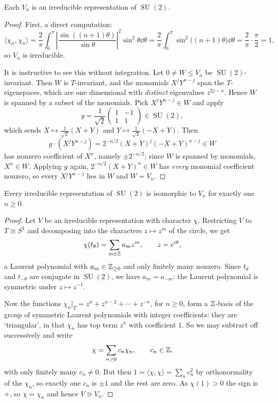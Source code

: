 \documentclass[a4paper]{scrartcl}
\newcommand{\SU}{\operatorname{SU}}
\newcommand{\ip}[2]{\langle #1, #2 \rangle}
\begin{document}
\begin{theorem}
	Each $V_n$ is an irreducible representation of $\SU(2)$.
\end{theorem}
\begin{proof}
	First, a direct computation:
	$$\ip{\chi_n}{\chi_n} = \frac2\pi\int_0^\pi\left|\frac{\sin((n+1)\theta)}{\sin\theta}\right|^2\sin^2\theta\dd\theta = \frac2\pi\int_0^\pi\sin^2\big((n+1)\theta\big)\dd\theta = \frac2\pi\cdot\frac\pi2 = 1,$$
	so $V_n$ is irreducible.

	It is instructive to see this without integration. Let $0\neq W\leq V_n$ be $\SU(2)$-invariant. Then $W$ is $T$-invariant, and the monomials $X^jY^{n-j}$ span the $T$-eigenspaces, which are one dimensional with \emph{distinct} eigenvalues $z^{2j-n}$. Hence $W$ is spanned by a subset of the monomials. Pick $X^jY^{n-j}\in W$ and apply
	$$g = \frac1{\sqrt2}\begin{pmatrix}1&-1\\1&1\end{pmatrix}\in\SU(2),$$
	which sends $X\mapsto\frac{1}{\sqrt2}(X+Y)$ and $Y\mapsto\frac1{\sqrt2}(-X+Y)$. Then
	$$g\cdot(X^jY^{n-j}) = 2^{-n/2}(X+Y)^j(-X+Y)^{n-j}\in W$$
	has nonzero coefficient of $X^n$, namely $\pm2^{-n/2}$; since $W$ is spanned by monomials, $X^n\in W$. Applying $g$ again, $2^{-n/2}(X+Y)^n\in W$ has \emph{every} monomial coefficient nonzero, so every $X^jY^{n-j}$ lies in $W$ and $W = V_n$.
\end{proof}

\begin{theorem}
	Every irreducible representation of $\SU(2)$ is isomorphic to $V_n$ for exactly one $n\geq0$.
\end{theorem}
\begin{proof}
	Let $V$ be an irreducible representation with character $\chi$. Restricting $V$ to $T\cong S^1$ and decomposing into the characters $z\mapsto z^m$ of the circle, we get
	$$\chi(t_\theta) = \sum_{m\in\mathbb{Z}}a_mz^m, \qquad z = e^{i\theta},$$
	a Laurent polynomial with $a_m\in\mathbb{Z}_{\geq0}$ and only finitely many nonzero. Since $t_\theta$ and $t_{-\theta}$ are conjugate in $\SU(2)$, we have $a_m = a_{-m}$: the Laurent polynomial is symmetric under $z\mapsto z^{-1}$.

	Now the functions $\chi_n|_T = z^n+z^{n-2}+\cdots+z^{-n}$, for $n\geq 0$, form a $\mathbb{Z}$-basis of the group of symmetric Laurent polynomials with integer coefficients: they are `triangular', in that $\chi_n$ has top term $z^n$ with coefficient $1$. So we may subtract off successively and write
	$$\chi = \sum_{n\geq0}c_n\chi_n, \qquad c_n\in\mathbb{Z},$$
	with only finitely many $c_n\neq0$. But then $1 = \ip\chi\chi = \sum_nc_n^2$ by orthonormality of the $\chi_n$, so exactly one $c_n$ is $\pm1$ and the rest are zero. As $\chi(1) > 0$ the sign is $+$, so $\chi = \chi_n$ and hence $V\cong V_n$.
\end{proof}
\end{document}
